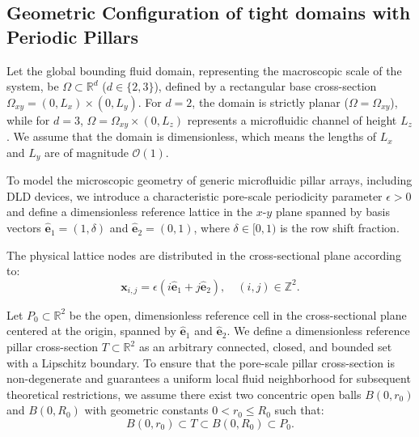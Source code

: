 \documentclass{elsarticle}
\begin{document}
\subsection{Geometric Configuration of tight domains with Periodic Pillars}\label{sec:problem_main_results1}

Let the global bounding fluid domain, representing the macroscopic scale of the system, be $\Omega \subset \mathbb{R}^d$ ($d \in \{2, 3\}$), defined by a rectangular base cross-section $\Omega_{xy} = (0, L_x) \times (0, L_y)$. For $d=2$, the domain is strictly planar ($\Omega = \Omega_{xy}$), while for $d=3$, $\Omega = \Omega_{xy} \times (0, L_z)$ represents a microfluidic channel of height $L_z$. We assume that the domain is dimensionless, which means the lengths of $L_x$ and $L_y$ are of magnitude $\mathcal{O}(1)$.%

To model the microscopic geometry of generic microfluidic pillar arrays, including DLD devices, we introduce a characteristic pore-scale periodicity parameter $\epsilon > 0$ and define a dimensionless reference lattice in the $x$-$y$ plane spanned by basis vectors $\hat{\mathbf{e}}_1 = (1, \delta)$ and $\hat{\mathbf{e}}_2 = (0, 1)$, where $\delta \in [0, 1)$ is the row shift fraction.

The physical lattice nodes are distributed in the cross-sectional plane according to:
\begin{equation}
    \mathbf{x}_{i,j} = \epsilon (i \hat{\mathbf{e}}_1 + j \hat{\mathbf{e}}_2), \quad (i,j) \in \mathbb{Z}^2.
\end{equation}

Let $P_0 \subset \mathbb{R}^2$ be the open, dimensionless reference cell in the cross-sectional plane centered at the origin, spanned by $\hat{\mathbf{e}}_1$ and $\hat{\mathbf{e}}_2$. We define a dimensionless reference pillar cross-section $T \subset \mathbb{R}^2$ as an arbitrary connected, closed, and bounded set with a Lipschitz boundary. To ensure that the pore-scale pillar cross-section is non-degenerate and guarantees a uniform local fluid neighborhood for subsequent theoretical restrictions, we assume there exist two concentric open balls $B(0, r_0)$ and $B(0, R_0)$ with geometric constants $0 < r_0 \le R_0$ such that:
\begin{equation}
    B(0, r_0) \subset T \subset B(0, R_0) \subset P_0.
\end{equation}
\end{document}
